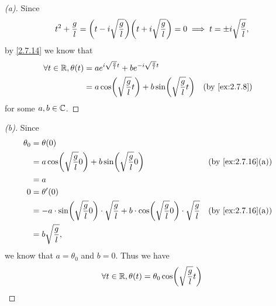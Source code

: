 \begin{proof}[(a)]
  Since
  \[
    t^2 + \frac{g}{l} = \pa{t - i \sqrt{\frac{g}{l}}} \pa{t + i \sqrt{\frac{g}{l}}} = 0 \implies t = \pm i \sqrt{\frac{g}{l}},
  \]
  by \cref{2.7.14} we know that
  \begin{align*}
    \forall t \in \R, \theta(t) & = a e^{i \sqrt{\frac{g}{l}} t} + b e^{- i \sqrt{\frac{g}{l}} t}                                      \\
                                & = a \cos\pa{\sqrt{\frac{g}{l}} t} + b \sin\pa{\sqrt{\frac{g}{l}} t} &  & \text{(by \cref{ex:2.7.8})}
  \end{align*}
  for some \(a, b \in \mathbb{C}\).
\end{proof}

\begin{proof}[(b)]
  Since
  \begin{align*}
    \theta_0 & = \theta(0)                                                                                                                                                             \\
             & = a \cos\pa{\sqrt{\frac{g}{l}} 0} + b \sin\pa{\sqrt{\frac{g}{l}} 0}                                                                &  & \text{(by \cref{ex:2.7.16}(a))} \\
             & = a                                                                                                                                                                     \\
    0        & = \theta'(0)                                                                                                                                                            \\
             & = -a \cdot \sin\pa{\sqrt{\frac{g}{l}} 0} \cdot \sqrt{\frac{g}{l}} + b \cdot \cos\pa{\sqrt{\frac{g}{l}} 0} \cdot \sqrt{\frac{g}{l}} &  & \text{(by \cref{ex:2.7.16}(a))} \\
             & = b \sqrt{\frac{g}{l}},
  \end{align*}
  we know that \(a = \theta_0\) and \(b = 0\).
  Thus we have
  \[
    \forall t \in \R, \theta(t) = \theta_0 \cos\pa{\sqrt{\frac{g}{l}} t}
  \]
\end{proof}

